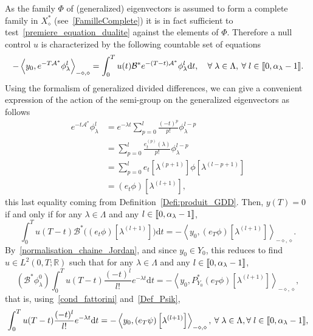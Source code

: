 \documentclass[AHL,Unicode,longabstracts]{cedram}
\newcommand{\llbracket}{\mathopen{[\mkern -2.7mu[}}
\newcommand{\rrbracket}{\mathclose{]\mkern -2.7mu]}}
\newcommand{\inter}[2]{\llbracket #1,#2 \rrbracket}
\newcommand\As{\mathcal{A}^*}
\newcommand\Bs{\mathcal{B}^*}
\newcommand{\Xalphas}{X_\diamond^*}
\newcommand{\Fzp}{Y_0}
\newcommand{\dual}[2]{\left\langle #1, #2 \right\rangle_{-\diamond,\diamond}}
\newcommand{\PFa}{P_{\Fzp}^*}
\newcommand{\R}{\mathbb{R}}
\newcommand{\md}{\mathrm{d}}
\let\oldforall\forall
\renewcommand*{\forall}{\mathrel{\oldforall}}
\begin{document}
As the family $\Phi$ of (generalized) eigenvectors is assumed to form a complete family in $\Xalphas$ (see~\eqref{FamilleComplete}) it is in fact sufficient to test~\eqref{premiere_equation_dualite} against the elements of $\Phi$. Therefore a null control $u$ is characterized by the following countable set of equations
\begin{equation}\label{pb_moment_v1}
-\dual{y_0}{e^{-T \As} \phi_\lambda^l} = \int_0^T u(t) \Bs e^{-(T-t) \As} \phi_\lambda^l \md t, \quad \forall \lambda \in \Lambda, \: \forall l \in \inter{0}{\alpha_\lambda-1}.
\end{equation}
Using the formalism of generalized divided differences, we can give a convenient expression of the action of the semi-group on the generalized eigenvectors as follows
\begin{equation}\label{Action_SemiGroupe_DDgeneralisees}
\begin{aligned}
e^{-t\As} \phi_\lambda^l & = e^{-\lambda t} \sum_{p=0}^l \frac{(-t)^p}{p!} \phi_\lambda^{l-p} \\
& = \sum_{p=0}^l \frac{e_t^{(p)}(\lambda)}{p!} \phi_\lambda^{l-p} \\
& = \sum_{p=0}^l e_t\left[\lambda^{(p+1)}\right] \phi\left[\lambda^{(l-p+1)}\right] \\
& = (e_t \phi) \left[\lambda^{(l+1)}\right],
\end{aligned}
\end{equation}
this last equality coming from Definition~\ref{Defi:produit_GDD}. Then, $y(T)=0$ if and only if for any $\lambda\in \Lambda$ and any $l\in \inter{0}{\alpha_{\lambda}-1}$,
\[
\int_0^T u(T-t) \Bs \big((e_t \phi) \left[\lambda^{(l+1)}\right] \big) \md t = -\dual{y_0}{(e_T \phi) \left[\lambda^{(l+1)}\right] }.
\]
By~\eqref{normalisation_chaine_Jordan}, and since $y_0\in \Fzp$, this reduces to find $u \in L^2(0,T;\R)$ such that for any $\lambda\in \Lambda$ and any $l\in \inter{0}{\alpha_{\lambda}-1}$,
\[
\left(\Bs \phi_{\lambda}^0\right) \int_0^T u(T-t) \frac{(-t)^l}{l!} e^{-\lambda t} \md t = -\dual{y_0}{\PFa (e_T \phi) \left[\lambda^{(l+1)}\right] },
\]
that is, using~\eqref{cond_fattorini} and~\eqref{Def_Psik},
\begin{equation}\label{Pbmoment_DDgeneralisees}
\int_0^T u(T-t) \frac{(-t)^l}{l!} e^{-\lambda t} \md t = -\dual{y_0}{(e_T \psi) \left[\lambda^{(l+1)}\right] }, \: \forall \lambda\in \Lambda,\forall l\in \inter{0}{\alpha_{\lambda}-1},
\end{equation}
\end{document}
